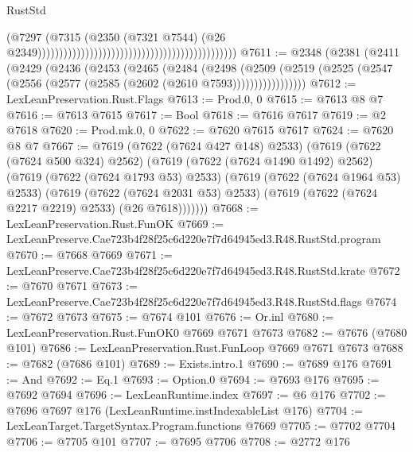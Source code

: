 \begin{lexlean}{RustStd}
\begin{coremodule}
                                                                                        (@7297
                                                                                          (@7315
                                                                                            (@2350
                                                                                              (@7321
                                                                                                @7544)
                                                                                              (@26
                                                                                                @2349))))))))))))))))))))))))))))))))))))))))))))))
@7611 := @2348
    (@2381
      (@2411
        (@2429
          (@2436
            (@2453
              (@2465
                (@2484
                  (@2498
                    (@2509
                      (@2519 (@2525 (@2547 (@2556 (@2577 (@2585 (@2602 (@2610 @7593)))))))))))))))))
@7612 := LexLeanPreservation.Rust.Flags
@7613 := Prod.{0, 0}
@7615 := @7613 @8 @7
@7616 := @7613 @7615
@7617 := Bool
@7618 := @7616 @7617
@7619 := @2 @7618
@7620 := Prod.mk.{0, 0}
@7622 := @7620 @7615 @7617
@7624 := @7620 @8 @7
@7667 := @7619
    (@7622 (@7624 @427 @148) @2533)
    (@7619
      (@7622 (@7624 @500 @324) @2562)
      (@7619
        (@7622 (@7624 @1490 @1492) @2562)
        (@7619
          (@7622 (@7624 @1793 @53) @2533)
          (@7619
            (@7622 (@7624 @1964 @53) @2533)
            (@7619
              (@7622 (@7624 @2031 @53) @2533)
              (@7619 (@7622 (@7624 @2217 @2219) @2533) (@26 @7618)))))))
@7668 := LexLeanPreservation.Rust.FunOK
@7669 := LexLeanPreserve.Cae723b4f28f25c6d220e7f7d64945ed3.R48.RustStd.program
@7670 := @7668 @7669
@7671 := LexLeanPreserve.Cae723b4f28f25c6d220e7f7d64945ed3.R48.RustStd.krate
@7672 := @7670 @7671
@7673 := LexLeanPreserve.Cae723b4f28f25c6d220e7f7d64945ed3.R48.RustStd.flags
@7674 := @7672 @7673
@7675 := @7674 @101
@7676 := Or.inl
@7680 := LexLeanPreservation.Rust.FunOK0 @7669 @7671 @7673
@7682 := @7676 (@7680 @101)
@7686 := LexLeanPreservation.Rust.FunLoop @7669 @7671 @7673
@7688 := @7682 (@7686 @101)
@7689 := Exists.intro.{1}
@7690 := @7689 @176
@7691 := And
@7692 := Eq.{1}
@7693 := Option.{0}
@7694 := @7693 @176
@7695 := @7692 @7694
@7696 := LexLeanRuntime.index
@7697 := @6 @176
@7702 := @7696 @7697 @176 (LexLeanRuntime.instIndexableList @176)
@7704 := LexLeanTarget.TargetSyntax.Program.functions @7669
@7705 := @7702 @7704
@7706 := @7705 @101
@7707 := @7695 @7706
@7708 := @2772 @176

\end{coremodule}
\end{lexlean}
